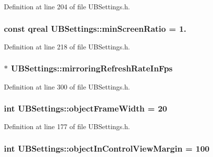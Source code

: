 Definition at line 204 of file U\-B\-Settings.\-h.

\hypertarget{class_u_b_settings_ab2bdac6ad6c19dfbe7a5ded5d5c6b5a0}{
\subsubsection[{min\-Screen\-Ratio}]{\setlength{\rightskip}{0pt plus 5cm}const qreal U\-B\-Settings\-::min\-Screen\-Ratio = 1.\hspace{0.3cm}{\ttfamily [static]}}}\label{db/d66/class_u_b_settings_ab2bdac6ad6c19dfbe7a5ded5d5c6b5a0}


Definition at line 218 of file U\-B\-Settings.\-h.

\hypertarget{class_u_b_settings_a844761cf83bfd8eb2885fbbd4f89e82f}{
\subsubsection[{mirroring\-Refresh\-Rate\-In\-Fps}]{$\ast$ U\-B\-Settings\-::mirroring\-Refresh\-Rate\-In\-Fps}}\label{db/d66/class_u_b_settings_a844761cf83bfd8eb2885fbbd4f89e82f}


Definition at line 300 of file U\-B\-Settings.\-h.

\hypertarget{class_u_b_settings_a1043e0bbaff0c3e31eb6472d771967a2}{
\subsubsection[{object\-Frame\-Width}]{\setlength{\rightskip}{0pt plus 5cm}int U\-B\-Settings\-::object\-Frame\-Width = 20\hspace{0.3cm}{\ttfamily [static]}}}\label{db/d66/class_u_b_settings_a1043e0bbaff0c3e31eb6472d771967a2}


Definition at line 177 of file U\-B\-Settings.\-h.

\hypertarget{class_u_b_settings_ada32d4a2077f1b7993992d994e407ead}{
\subsubsection[{object\-In\-Control\-View\-Margin}]{\setlength{\rightskip}{0pt plus 5cm}int U\-B\-Settings\-::object\-In\-Control\-View\-Margin = 100\hspace{0.3cm}{\ttfamily [static]}}}\label{db/d66/class_u_b_settings_ada32d4a2077f1b7993992d994e407ead}


